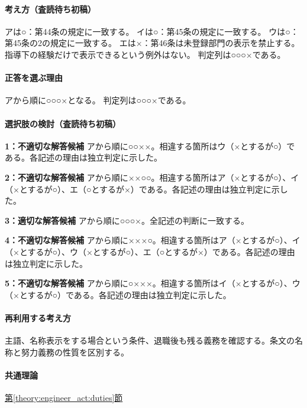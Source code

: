 \paragraph{考え方（査読待ち初稿）} アは○：第44条の規定に一致する。 イは○：第45条の規定に一致する。 ウは○：第45条の2の規定に一致する。 エは×：第46条は未登録部門の表示を禁止する。指導下の経験だけで表示できるという例外はない。 判定列は○○○×である。

\paragraph{正答を選ぶ理由} アから順に○○○×となる。  判定列は○○○×である。

\paragraph{選択肢の検討（査読待ち初稿）}\mbox{}\par

\noindent\textbf{1：不適切な解答候補} アから順に○○××。相違する箇所はウ（×とするが○）である。各記述の理由は独立判定に示した。\par

\noindent\textbf{2：不適切な解答候補} アから順に××○○。相違する箇所はア（×とするが○）、イ（×とするが○）、エ（○とするが×）である。各記述の理由は独立判定に示した。\par

\noindent\textbf{3：適切な解答候補} アから順に○○○×。全記述の判断に一致する。\par

\noindent\textbf{4：不適切な解答候補} アから順に×××○。相違する箇所はア（×とするが○）、イ（×とするが○）、ウ（×とするが○）、エ（○とするが×）である。各記述の理由は独立判定に示した。\par

\noindent\textbf{5：不適切な解答候補} アから順に○×××。相違する箇所はイ（×とするが○）、ウ（×とするが○）である。各記述の理由は独立判定に示した。\par

\paragraph{再利用する考え方} 主語、名称表示をする場合という条件、退職後も残る義務を確認する。条文の名称と努力義務の性質を区別する。

\paragraph{共通理論} \hyperref[theory:engineer_act:duties]{第\ref*{theory:engineer_act:duties}節}


